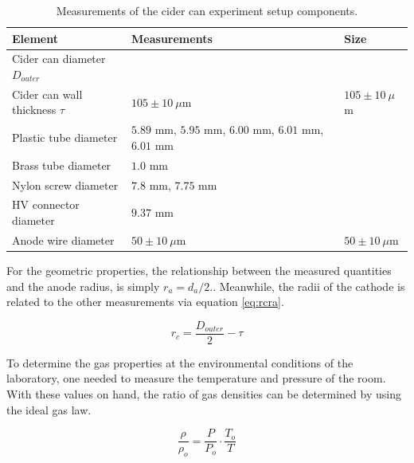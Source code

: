 \begin{table}[htb]
  \begin{tabularx}{\linewidth}{X|X|p{2cm}}
    \textbf{Element}                   & \textbf{Measurements}                                 & \textbf{Size}       \\ \hline
    Cider can diameter $D_{outer}$      &                                                       &                     \\
    Cider can wall thickness   $\tau$ & $105 \pm 10 \ \mu$m                                   & $105 \pm 10 \ \mu$m \\
    Plastic tube diameter             & $5.89$ mm, $5.95$ mm, $6.00$ mm, $6.01$ mm, $6.01$ mm &                     \\
    Brass tube diameter               & $1.0$ mm                                              &                     \\
    Nylon screw diameter              & $7.8$ mm, $7.75$ mm                                   &                     \\
    HV connector diameter             & $9.37$ mm                                             &                     \\
    Anode wire diameter               & $50 \pm 10 \ \mu$m                                    & $50 \pm 10 \ \mu$m  \\
    \hline
  \end{tabularx}
  \caption{Measurements of the cider can experiment setup components.}
  \label{Tab:cidercan_sizes}
\end{table}

For the geometric properties, the relationship between the measured quantities and the anode radius, is simply $r_{a} = d_{a}/2.$. Meanwhile, the radii of the cathode is related to the other measurements via equation \ref{eq:rcra}.

\begin{equation}
  \label{eq:rcra}
  r_{c} = \frac{D_{outer}}{2}-\tau
\end{equation}

To determine the gas properties at the environmental conditions of the laboratory, one needed to measure the temperature and pressure of the room. With these values on hand, the ratio of gas densities can be determined by using the ideal gas law.

\begin{equation}
  \label{eq:gaslaw}
  \frac{\rho}{\rho_{o}} = \frac{P}{P_{o}}\cdot \frac{T_{o}}{T}
\end{equation}

